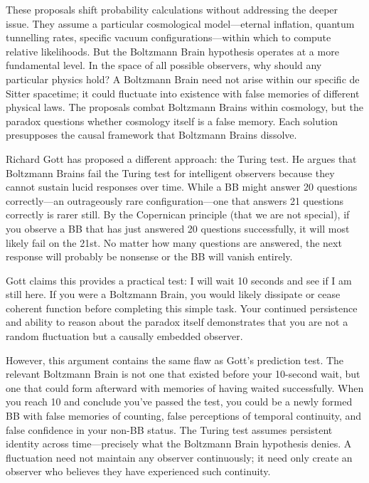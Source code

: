 These proposals shift probability calculations without addressing the deeper issue. They assume a particular cosmological model—eternal inflation, quantum tunnelling rates, specific vacuum configurations—within which to compute relative likelihoods. But the Boltzmann Brain hypothesis operates at a more fundamental level. In the space of all possible observers, why should any particular physics hold? A Boltzmann Brain need not arise within our specific de Sitter spacetime; it could fluctuate into existence with false memories of different physical laws. The proposals combat Boltzmann Brains within cosmology, but the paradox questions whether cosmology itself is a false memory. Each solution presupposes the causal framework that Boltzmann Brains dissolve.

Richard Gott has proposed a different approach: the Turing test. He argues that Boltzmann Brains fail the Turing test for intelligent observers because they cannot sustain lucid responses over time. While a BB might answer 20 questions correctly—an outrageously rare configuration—one that answers 21 questions correctly is rarer still. By the Copernican principle (that we are not special), if you observe a BB that has just answered 20 questions successfully, it will most likely fail on the 21st. No matter how many questions are answered, the next response will probably be nonsense or the BB will vanish entirely.

Gott claims this provides a practical test: \QENOpen{}I will wait 10 seconds and see if I am still here.\QENClose{} If you were a Boltzmann Brain, you would likely dissipate or cease coherent function before completing this simple task. Your continued persistence and ability to reason about the paradox itself demonstrates that you are not a random fluctuation but a causally embedded observer.

However, this argument contains the same flaw as Gott's prediction test. The relevant Boltzmann Brain is not one that existed before your 10-second wait, but one that could form afterward with memories of having waited successfully. When you reach \QSOpen{}10\QSClose{} and conclude you've passed the test, you could be a newly formed BB with false memories of counting, false perceptions of temporal continuity, and false confidence in your non-BB status. The Turing test assumes persistent identity across time—precisely what the Boltzmann Brain hypothesis denies. A fluctuation need not maintain any observer continuously; it need only create an observer who believes they have experienced such continuity.

